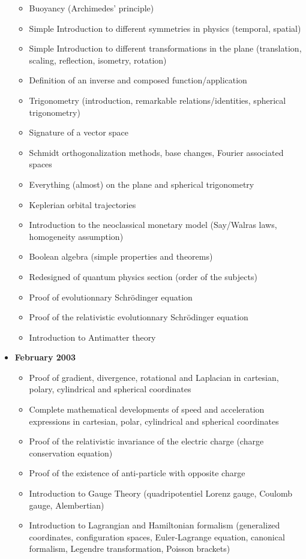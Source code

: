 \documentclass[12pt,a4paper,twoside,openright]{report}
\theoremstyle{definition}
\theoremstyle{itexmp}
\numberwithin{equation}{section}
\begin{document}
\begin{itemize}
\begin{itemize}[noitemsep]
				\item Buoyancy (Archimedes' principle)
				\item Simple Introduction to different symmetries in physics (temporal, spatial)
				\item Simple Introduction to different transformations in the plane (translation, scaling, reflection, isometry, rotation)
				\item Definition of an inverse and composed function/application
				\item Trigonometry (introduction, remarkable relations/identities, spherical trigonometry)
				\item Signature of a vector space
				\item Schmidt orthogonalization methods, base changes, Fourier associated spaces
				\item Everything (almost) on the plane and spherical trigonometry
				\item Keplerian orbital trajectories
				\item Introduction to the neoclassical monetary model (Say/Walras laws, homogeneity assumption)
				\item Boolean algebra (simple properties and theorems)
				\item Redesigned of quantum physics section (order of the subjects)
				\item Proof of evolutionnary Schrödinger  equation
				\item Proof of the relativistic evolutionnary Schrödinger equation
				\item Introduction to Antimatter theory
			\end{itemize}
		\item \textbf{February 2003}
				\begin{itemize}[noitemsep]
				\item Proof of gradient, divergence, rotational and Laplacian in cartesian, polary, cylindrical and spherical coordinates
				\item Complete mathematical developments of speed and acceleration expressions in cartesian, polar, cylindrical and spherical coordinates 
				\item Proof  of the relativistic invariance of the electric charge (charge conservation equation) 
				\item Proof of the existence of anti-particle  with opposite charge 
				\item Introduction to Gauge Theory (quadripotentiel Lorenz gauge, Coulomb gauge, Alembertian) 
				\item Introduction to Lagrangian and Hamiltonian formalism (generalized coordinates, configuration spaces, Euler-Lagrange equation, canonical formalism, Legendre transformation, Poisson brackets) 

\end{itemize}
\end{itemize}
\end{document}
